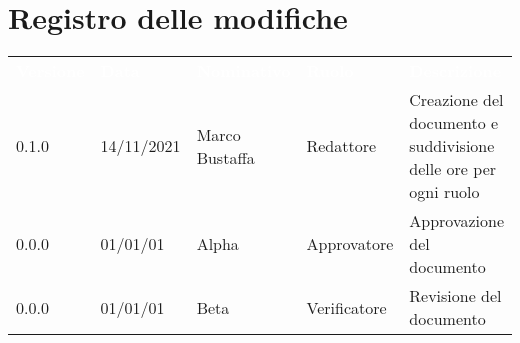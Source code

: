 \section*{Registro delle modifiche}

{\renewcommand{\arraystretch}{1.5}
\begin{tabular}{p{0.15\linewidth}p{0.14\linewidth}p{0.21\linewidth}p{0.15\linewidth}p{0.35\linewidth}}
	\rowcolor[RGB]{33, 73, 50}
	\textcolor{white}{\textbf{Versione}} & \textcolor{white}{\textbf{Data}} & \textcolor{white}
	{\textbf{Nominativo}} & \textcolor{white}{\textbf{Ruolo}} & \textcolor{white}
	{\textbf{Descrizione}}\\
	\rowcolor[RGB]{216, 235, 171}
	0.1.0 & 14/11/2021 & Marco Bustaffa & Redattore & Creazione del documento e suddivisione delle ore per ogni ruolo\\
	\rowcolor[RGB]{233, 245, 206}
	0.0.0 & 01/01/01 & Alpha & Approvatore & Approvazione del documento\\
	\rowcolor[RGB]{216, 235, 171}
	0.0.0 & 01/01/01 & Beta & Verificatore & Revisione del documento\\
\end{tabular}	
}